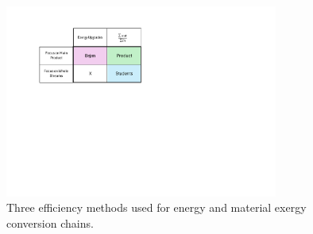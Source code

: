 \documentclass[energies,article,submit,pdftex,moreauthors]{Definitions/mdpi}
\begin{document}
\begin{figure}[h!]
  \centering
  \includegraphics[width=0.8\textwidth]{images/efficiency_methods.pdf}
  \caption{Three efficiency methods used for energy and material exergy conversion chains.}
  \label{fig:Efficiency Methods}
\end{figure}
\end{document}
